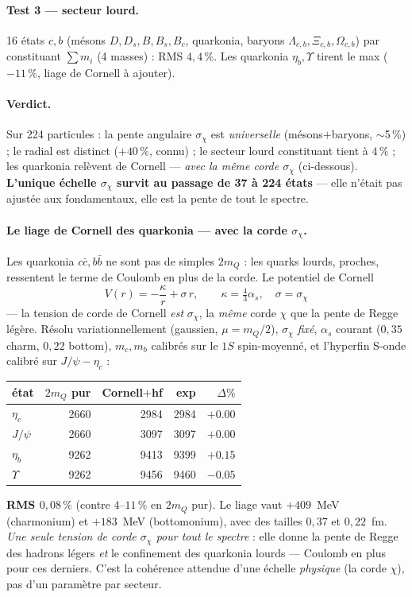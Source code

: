 \documentclass[11pt]{article}
\begin{document}
\paragraph{Test 3 --- secteur lourd.} 16 états $c,b$ (mésons $D,D_s,B,B_s,B_c$, quarkonia, baryons $\Lambda_{c,b},\Xi_{c,b},\Omega_{c,b}$) par constituant $\sum m_i$ (4 masses) : RMS $4{,}4\,\%$. Les quarkonia $\eta_b,\Upsilon$ tirent le max ($-11\,\%$, liage de Cornell à ajouter).

\paragraph{Verdict.} Sur 224 particules : la pente angulaire $\sigma_\chi$ est \emph{universelle} (mésons$+$baryons, $\sim$5\,\%) ; le radial est distinct ($+40\,\%$, connu) ; le secteur lourd constituant tient à $4\,\%$ ; les quarkonia relèvent de Cornell --- \emph{avec la même corde $\sigma_\chi$} (ci-dessous). \textbf{L'unique échelle $\sigma_\chi$ survit au passage de 37 à 224 états} --- elle n'était pas ajustée aux fondamentaux, elle est la pente de tout le spectre.

\paragraph{Le liage de Cornell des quarkonia --- avec la corde $\sigma_\chi$.} Les quarkonia $c\bar c,b\bar b$ ne sont pas de simples $2m_Q$ : les quarks lourds, proches, ressentent le terme de Coulomb en plus de la corde. Le potentiel de Cornell
\[
V(r)=-\frac{\kappa}{r}+\sigma\,r,\qquad \kappa=\tfrac43\alpha_s,\quad \boxed{\sigma=\sigma_\chi}
\]
--- la tension de corde de Cornell \emph{est} $\sigma_\chi$, la \emph{même} corde $\chi$ que la pente de Regge légère. Résolu variationnellement (gaussien, $\mu=m_Q/2$), $\sigma_\chi$ \emph{fixé}, $\alpha_s$ courant ($0{,}35$ charm, $0{,}22$ bottom), $m_c,m_b$ calibrés sur le $1S$ spin-moyenné, et l'hyperfin S-onde calibré sur $J/\psi{-}\eta_c$ :
\begin{center}\footnotesize
\begin{tabular}{@{}lrrrr@{}}
\toprule
état & $2m_Q$ pur & Cornell$+$hf & exp & $\Delta\%$ \\
\midrule
$\eta_c$ & 2660 & 2984 & 2984 & $+0.00$ \\
$J/\psi$ & 2660 & 3097 & 3097 & $+0.00$ \\
$\eta_b$ & 9262 & 9413 & 9399 & $+0.15$ \\
$\Upsilon$ & 9262 & 9456 & 9460 & $-0.05$ \\
\bottomrule
\end{tabular}
\end{center}
\textbf{RMS $0{,}08\,\%$} (contre $4$--$11\,\%$ en $2m_Q$ pur). Le liage vaut $+409$~MeV (charmonium) et $+183$~MeV (bottomonium), avec des tailles $0{,}37$ et $0{,}22$~fm. \emph{Une seule tension de corde $\sigma_\chi$ pour tout le spectre} : elle donne la pente de Regge des hadrons légers \emph{et} le confinement des quarkonia lourds --- Coulomb en plus pour ces derniers. C'est la cohérence attendue d'une échelle \emph{physique} (la corde $\chi$), pas d'un paramètre par secteur.
\end{document}
